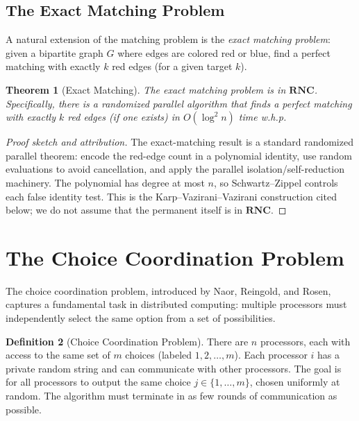 \documentclass[twoside,12pt]{book}
\theoremstyle{plain}
\newtheorem{theorem}{Theorem}[chapter]
\theoremstyle{definition}
\newtheorem{definition}[theorem]{Definition}
\theoremstyle{remark}
\begin{document}
\subsection{The Exact Matching Problem}
\label{subsec:exact-matching}

A natural extension of the matching problem is the \emph{exact matching problem}: given a bipartite graph $G$ where edges are colored red or blue, find a perfect matching with exactly $k$ red edges (for a given target $k$).

\begin{theorem}[Exact Matching]
\label{thm:exact-matching}
The exact matching problem is in $\mathbf{RNC}$. Specifically, there is a randomized parallel algorithm that finds a perfect matching with exactly $k$ red edges (if one exists) in $O(\log^2 n)$ time w.h.p.
\end{theorem}

\begin{proof}[Proof sketch and attribution]
The exact-matching result is a standard randomized parallel theorem: encode
the red-edge count in a polynomial identity, use random evaluations to avoid
cancellation, and apply the parallel isolation/self-reduction machinery. The
polynomial has degree at most $n$, so Schwartz--Zippel controls each false
identity test. This is the Karp--Vazirani--Vazirani construction cited below;
we do not assume that the permanent itself is in $\mathbf{RNC}$.
\end{proof}

\section{The Choice Coordination Problem}
\label{sec:choice-coordination}

The choice coordination problem, introduced by Naor, Reingold, and Rosen, captures a fundamental task in distributed computing: multiple processors must independently select the same option from a set of possibilities.

\begin{definition}[Choice Coordination Problem]
\label{def:choice-coordination}
There are $n$ processors, each with access to the same set of $m$ choices (labeled $1, 2, \ldots, m$). Each processor $i$ has a private random string and can communicate with other processors. The goal is for all processors to output the same choice $j \in \{1, \ldots, m\}$, chosen uniformly at random. The algorithm must terminate in as few rounds of communication as possible.
\end{definition}
\end{document}
